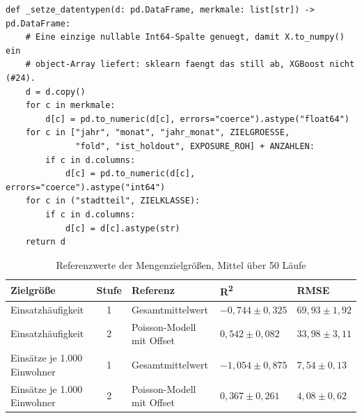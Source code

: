 
\begin{lstlisting}[style=pythonstil,
  label={lst:dtypes},
  caption={Vereinheitlichung der Datentypen
           (\texttt{prep/s2\_datensaetze.py}, Z.~151--174, gekürzt)}]
def _setze_datentypen(d: pd.DataFrame, merkmale: list[str]) -> pd.DataFrame:
    # Eine einzige nullable Int64-Spalte genuegt, damit X.to_numpy() ein
    # object-Array liefert: sklearn faengt das still ab, XGBoost nicht (#24).
    d = d.copy()
    for c in merkmale:
        d[c] = pd.to_numeric(d[c], errors="coerce").astype("float64")
    for c in ["jahr", "monat", "jahr_monat", ZIELGROESSE,
              "fold", "ist_holdout", EXPOSURE_ROH] + ANZAHLEN:
        if c in d.columns:
            d[c] = pd.to_numeric(d[c], errors="coerce").astype("int64")
    for c in ("stadtteil", ZIELKLASSE):
        if c in d.columns:
            d[c] = d[c].astype(str)
    return d
\end{lstlisting}



\begin{table}[htbp]
    \centering
    \caption{Referenzwerte der Mengenzielgrößen, Mittel über 50 Läufe}
    \label{tab:baselines-menge}
    \footnotesize
    \singlespacing
    \setlength{\tabcolsep}{5pt}
    \begin{tabularx}{\textwidth}{@{}>{\raggedright\arraybackslash}p{3.9cm} c >{\raggedright\arraybackslash}X l l@{}}
        \toprule
        \textbf{Zielgröße} & \textbf{Stufe} & \textbf{Referenz} & \textbf{R\textsuperscript{2}} & \textbf{RMSE} \\
        \midrule
        Einsatzhäufigkeit & 1 & Gesamtmittelwert & $-0{,}744 \pm 0{,}325$ & $69{,}93 \pm 1{,}92$ \\
        Einsatzhäufigkeit & 2 & Poisson-Modell mit Offset & $0{,}542 \pm 0{,}082$ & $33{,}98 \pm 3{,}11$ \\
        \addlinespace
        Einsätze je 1.000 Einwohner & 1 & Gesamtmittelwert & $-1{,}054 \pm 0{,}875$ & $7{,}54 \pm 0{,}13$ \\
        Einsätze je 1.000 Einwohner & 2 & Poisson-Modell mit Offset & $0{,}367 \pm 0{,}261$ & $4{,}08 \pm 0{,}62$ \\
        \bottomrule
    \end{tabularx}
\end{table}


